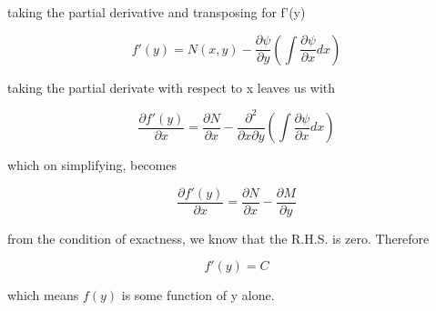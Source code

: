 \documentclass{article}
\begin{document}
	taking the partial derivative and transposing for f'(y)
	
	$$ f'(y) = N(x,y) - \frac{\partial\psi}{\partial y} \left(\int \frac{\partial \psi}{\partial x}dx\right) $$
	
	taking the partial derivate with respect to x leaves us with
	
	$$ \frac{\partial f'(y)}{\partial x} = \frac{\partial N}{\partial x} - \frac{\partial^2 }{\partial x \partial y}\left(\int \frac{\partial \psi}{\partial x}dx \right) $$
	
	which on simplifying, becomes
	
	$$ \frac{\partial f'(y)}{\partial x} = \frac{\partial N}{\partial x} - \frac{\partial M}{\partial y} $$
	
	from the condition of exactness, we know that the R.H.S. is zero. Therefore
	
	$$f'(y) = C$$
	
	which means $f(y)$ is some function of y alone.
\end{document}
